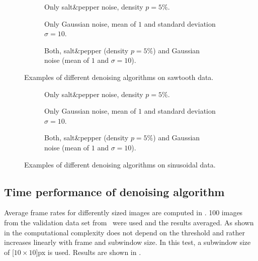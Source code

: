 \begin{figure}[]
  \centering
  \begin{subfigure}[]{\textwidth}
    \centering
    
    \caption{Only salt\&pepper noise, density $p = 5\%$.}
  \end{subfigure}
  \begin{subfigure}[]{\textwidth}
    \centering
    
    \caption{Only Gaussian noise, mean of $1$ and standard deviation $\sigma = 10$.}
  \end{subfigure}
  \begin{subfigure}[]{\textwidth}
    \centering
    
    \caption{Both, salt\&pepper (density $p = 5\%$) and Gaussian noise (mean of $1$ and $\sigma = 10$).}
  \end{subfigure}
  \caption{Examples of different denoising algorithms on sawtooth data.}
  \label{fig:sensor_experiments_1d_sawtooth}
\end{figure}

\begin{figure}[]
  \centering
  \begin{subfigure}[]{\textwidth}
    \centering
    
    \caption{Only salt\&pepper noise, density $p = 5\%$.}
  \end{subfigure}
  \begin{subfigure}[]{\textwidth}
    \centering
    
    \caption{Only Gaussian noise, mean of $1$ and standard deviation $\sigma = 10$.}
  \end{subfigure}
  \begin{subfigure}[]{\textwidth}
    \centering
    
    \caption{Both, salt\&pepper (density $p = 5\%$) and Gaussian noise (mean of $1$ and $\sigma = 10$).}
  \end{subfigure}
  \caption{Examples of different denoising algorithms on sinusoidal data.}
  \label{fig:sensor_experiments_1d_sinus}
\end{figure}





\subsection{Time performance of denoising algorithm}

Average frame rates for differently sized images are computed in . 
100 images from the validation data set from~\cite{arbelaez2011contour} were used and the results averaged. 
As shown in  the computational complexity does not depend on the threshold and rather increases linearly with frame and subwindow size.
In this test, a subwindow size of \unit[$10\times 10$]{px} is used.
Results are shown in .

